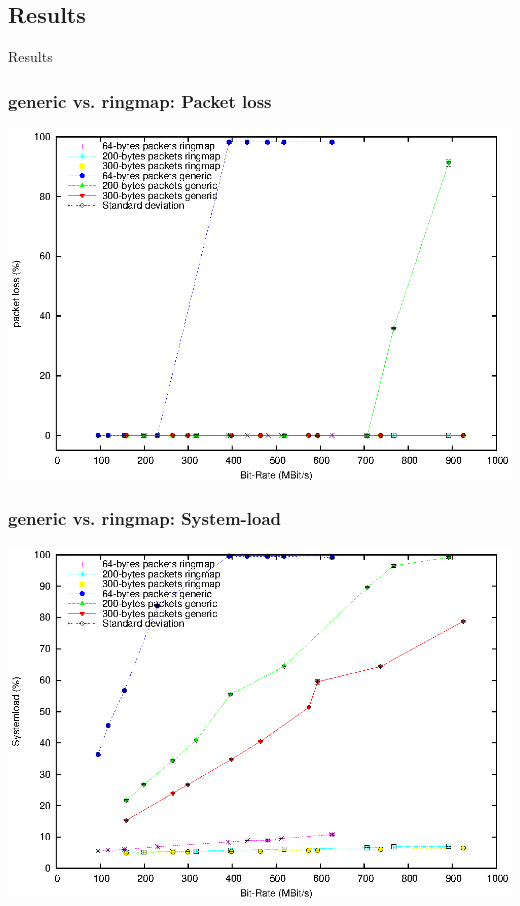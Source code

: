 \documentclass{beamer}
\begin{document}
\subsection*{Results}
\begin{frame}
	\begin{center}
	\huge{Results}
	\end{center}
\end{frame}
\begin{frame}
\frametitle{generic vs. ringmap: Packet loss}
\begin{center}
\includegraphics [height=0.81\textheight]{plots/pktloss_generic_vs_ringmap_mbs.eps}
\end{center}
\end{frame}

\begin{frame}
\frametitle{generic vs. ringmap: System-load}
\begin{center}
\includegraphics [height=0.81\textheight]{plots/sysload_generic_vs_ringmap_mbs.eps}
\end{center}
\end{frame}
\end{document}
